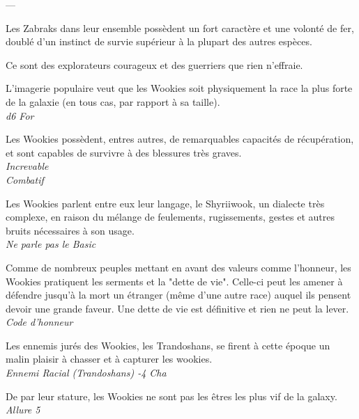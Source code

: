 ---

Les Zabraks dans leur ensemble possèdent un fort caractère et une volonté de fer, doublé d'un instinct de survie supérieur à la plupart des autres espèces.

Ce sont des explorateurs courageux et des guerriers que rien n'effraie.


\begin{description}[align=left]
\item [Force de la nature] 				%
	L'imagerie populaire veut que les Wookies soit physiquement la race la plus forte de la galaxie (en tous cas, par rapport à sa taille).\\
	\emph{d6 For}
\item [Increvable] 						%
	Les Wookies possèdent, entres autres, de remarquables capacités de récupération, et sont capables de survivre à des blessures très graves.\\
	\emph{Increvable}\\
	\emph{Combatif}
\item [Shyriiwook] 						%
		Les Wookies parlent entre eux leur langage, le Shyriiwook, un dialecte très complexe, en raison du mélange de feulements, rugissements, gestes et autres bruits nécessaires à son usage.\\
		\emph{Ne parle pas le Basic}
\item [Force \& Honneur] 				%
	Comme de nombreux peuples mettant en avant des valeurs comme l'honneur, les Wookies pratiquent les serments et la "dette de vie". Celle-ci peut les amener à défendre jusqu'à la mort un étranger (même d'une autre race) auquel ils pensent devoir une grande faveur. Une dette de vie est définitive et rien ne peut la lever.\\
	\emph{Code d'honneur}
\item [Ennemis jurés] 					%
	Les ennemis jurés des Wookies, les Trandoshans, se firent à cette époque un malin plaisir à chasser et à capturer les wookies.\\
	\emph{Ennemi Racial (Trandoshans) -4 Cha}
\item [Il faut partir à point] 			%
	De par leur stature, les Wookies ne sont pas les êtres les plus vif de la galaxy.\\
	\emph{Allure 5}
\end{description}